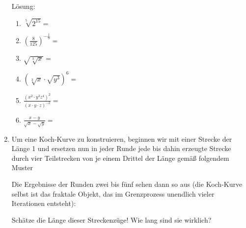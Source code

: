 \documentclass[../main.tex]{subfiles}
\begin{document}
\begin{enumerate}
	      Lösung:
	      \begin{enumerate}
		      \item \begin{math}
			            \sqrt[5]{2^{15}}
			            =
		            \end{math}
		      \item \begin{math}
			            (\frac{8}{125})^{-\frac{1}{3}}
			            =
		            \end{math}
		      \item \begin{math}
			            \sqrt{\sqrt[3]{x}}
			            =
		            \end{math}
		      \item \begin{math}
			            (\sqrt[3]{x} \cdot \sqrt{y^3})^6
			            =
		            \end{math}
		      \item \begin{math}
			            \frac{(x^2 \cdot y^3 z^4)^2}{
				            (x \cdot y \cdot z)^{-2}
			            }
			            =
		            \end{math}
		      \item \begin{math}
			            \frac{x - y}{ \sqrt{x} - \sqrt{y} }
			            =
		            \end{math}
	      \end{enumerate}
	\item Um eine Koch-Kurve zu konstruieren, beginnen wir mit einer Strecke der Länge 1 und
	      ersetzen nun in jeder Runde jede bis dahin erzeugte Strecke durch vier Teilstrecken von je einem Drittel
	      der Länge gemäß folgendem Muster

	      Die Ergebnisse der Runden zwei bis fünf sehen dann so aus
	      (die Koch-Kurve selbst ist das fraktale Objekt, das im Grenzprozess unendlich vieler Iterationen entsteht):

	      Schätze die Länge dieser Streckenzüge! Wie lang sind sie wirklich?


\end{enumerate}
\end{document}
